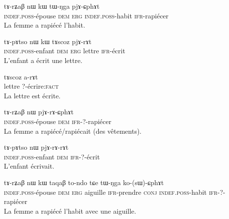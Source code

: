 \documentclass[oldfontcommands,twoside,a4paper,12pt]{article}
\begin{document}
\begin{exe}
\ex 
\gll tɤ-rʑaβ nɯ kɯ  tɯ-ŋga pjɤ-ɕphɤt \\ 
\textsc{indef.poss}-épouse \textsc{dem} \textsc{erg} \textsc{indef.poss}-habit \textsc{ifr}-rapiécer \\
\glt La femme a rapiécé l'habit.
\end{exe} 

\begin{exe}
\ex 
\gll tɤ-pɤtso nɯ kɯ tɤscoz pjɤ-rɤt \\ 
\textsc{indef.poss}-enfant \textsc{dem} \textsc{erg} lettre \textsc{ifr}-écrit \\
\glt L'enfant a écrit une lettre.
\end{exe} 

\begin{exe}
\ex 
\gll tɤscoz a-rɤt \\ 
lettre ?-écrire:\textsc{fact} \\
\glt La lettre est écrite.
\end{exe}

 \begin{exe}
\ex 
\gll tɤ-rʑaβ  nɯ pjɤ-rɤ-ɕphɤt \\
\textsc{indef.poss}-épouse \textsc{dem} \textsc{ifr}-?-rapiécer \\
\glt La femme a rapiécé/rapiécait (des vêtements).
\end{exe} 

\begin{exe}
\ex 
\gll tɤ-pɤtso nɯ  pjɤ-rɤ-rɤt \\ 
\textsc{indef.poss}-enfant \textsc{dem}  \textsc{ifr}-?-écrit \\
\glt L'enfant écrivait.
\end{exe} 


\begin{exe}
\ex 
\gll tɤ-rʑaβ nɯ kɯ taqaβ to-ndo tɕe tɯ-ŋga ko-(sɯ)-ɕphɤt \\
\textsc{indef.poss}-épouse \textsc{dem} \textsc{erg} aiguille \textsc{ifr}-prendre \textsc{conj} \textsc{indef.poss}-habit \textsc{ifr}-?-rapiécer \\
\glt La femme a rapiécé l'habit avec une aiguille.
\end{exe} 
\end{document}

